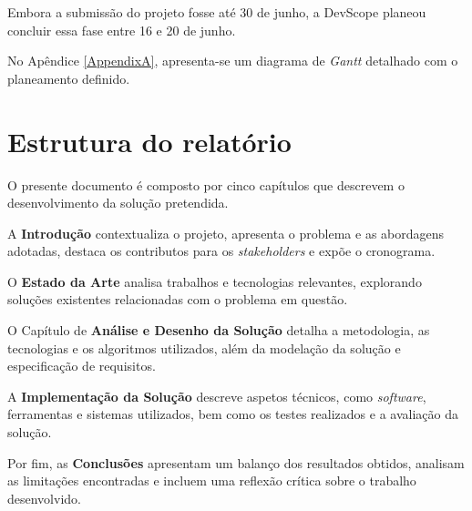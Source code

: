 Embora a submissão do projeto fosse até 30 de junho, a DevScope planeou concluir essa fase entre 16 e 20 de junho.

 No Apêndice \ref{AppendixA}, apresenta-se um diagrama de \textit{Gantt} detalhado com o planeamento definido.


\section{Estrutura do relatório}

O presente documento é composto por cinco capítulos que descrevem o desenvolvimento da solução pretendida.

A \textbf{Introdução} contextualiza o projeto, apresenta o problema e as abordagens adotadas, destaca os contributos para os \textit{stakeholders} e expõe o cronograma.

O \textbf{Estado da Arte} analisa trabalhos e tecnologias relevantes, explorando soluções existentes relacionadas com o problema em questão.

O Capítulo de \textbf{Análise e Desenho da Solução} detalha a metodologia, as tecnologias e os algoritmos utilizados, além da modelação da solução e especificação de requisitos.

A \textbf{Implementação da Solução} descreve aspetos técnicos, como \textit{software}, ferramentas e sistemas utilizados, bem como os testes realizados e a avaliação da solução.

Por fim, as \textbf{Conclusões} apresentam um balanço dos resultados obtidos, analisam as limitações encontradas e incluem uma reflexão crítica sobre o trabalho desenvolvido.

\vspace{20mm} 
